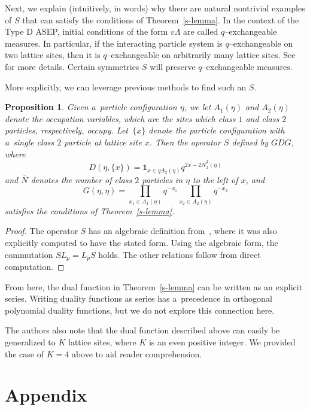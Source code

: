 \documentclass[10pt,a4paper]{amsart}
\numberwithin{equation}{section}
\newtheorem{Proposition}[Theorem]{Proposition}
\theoremstyle{definition}
\begin{document}
Next, we explain (intuitively, in words) why there are natural nontrivial examples of $S$ that can satisfy the conditions of Theorem~\ref{s-lemma}. In the context of the Type D ASEP, initial conditions of the form $v\Lambda$ are called $q$--exchangeable measures. In particular, if the interacting particle system is $q$--exchangeable on two lattice sites, then it is $q$--exchangeable on arbitrarily many lattice sites. See~\cite{kuan2024qexchangeablemeasurestransformationsinteracting} for more details. Certain symmetries $S$ will preserve $q$--exchangeable measures.

More explicitly, we can leverage previous methods to find such an $S$.
\begin{Proposition}
Given a~particle configuration $\eta$, we let $A_1(\eta)$ and $A_2(\eta)$ denote the occupation variables, which are the sites which class $1$ and class $2$ particles, respectively, occupy. Let~$\{x\}$ denote the particle configuration with a~single class $2$ particle at lattice site $x$. Then the operator $S$ defined by $GDG$, where
 \[D(\eta, \{x\}) = \mathds{1}_{x \in q A_2(\eta)} q^{2x - 2\overline{N}_x^2(\eta)}\]
 and $\overline{N}$ denotes the number of class $2$ particles in $\eta$ to the left of $x$, and
 \[
G(\eta,\eta)=\prod_{x_1 \in A_1(\eta)} q^{-x_1} \prod_{x_2 \in A_2(\eta)} q^{-x_2}
 \]
 satisfies the conditions of Theorem~{\rm\ref{s-lemma}}.
\end{Proposition}
\begin{proof}
 The operator $S$ has an algebraic definition from~\cite{kuan2020interactingparticlesystemstype}, where it was also explicitly computed to have the stated form. Using the algebraic form, the commutation $SL_p=L_pS$ holds. The other relations follow from direct computation.
\end{proof}

From here, the dual function in Theorem~\ref{s-lemma} can be written as an explicit series. Writing duality functions as series has a~precedence in orthogonal polynomial duality functions, but we do not explore this connection here.

The authors also note that the dual function described above can easily be generalized to $K$ lattice sites, where $K$ is an even positive integer. We provided the case of $K=4$ above to aid reader comprehension.

\appendix


\section{Appendix} \label{section--Appendix}
\end{document}
